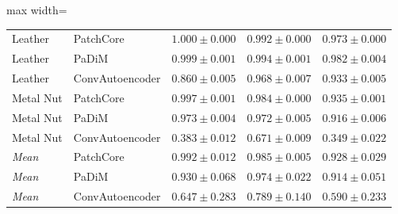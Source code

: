 \begin{table}[tbp]
\begin{adjustbox}{max width=\linewidth}
\begin{tabular}{llccc}
\midrule
Leather & PatchCore & $1.000 \pm 0.000$ & $0.992 \pm 0.000$ & $0.973 \pm 0.000$ \\
Leather & PaDiM & $0.999 \pm 0.001$ & $0.994 \pm 0.001$ & $0.982 \pm 0.004$ \\
Leather & ConvAutoencoder & $0.860 \pm 0.005$ & $0.968 \pm 0.007$ & $0.933 \pm 0.005$ \\
\midrule
Metal Nut & PatchCore & $0.997 \pm 0.001$ & $0.984 \pm 0.000$ & $0.935 \pm 0.001$ \\
Metal Nut & PaDiM & $0.973 \pm 0.004$ & $0.972 \pm 0.005$ & $0.916 \pm 0.006$ \\
Metal Nut & ConvAutoencoder & $0.383 \pm 0.012$ & $0.671 \pm 0.009$ & $0.349 \pm 0.022$ \\
\midrule
\textit{Mean} & PatchCore & $0.992 \pm 0.012$ & $0.985 \pm 0.005$ & $0.928 \pm 0.029$ \\
\textit{Mean} & PaDiM & $0.930 \pm 0.068$ & $0.974 \pm 0.022$ & $0.914 \pm 0.051$ \\
\textit{Mean} & ConvAutoencoder & $0.647 \pm 0.283$ & $0.789 \pm 0.140$ & $0.590 \pm 0.233$ \\
\bottomrule
\end{tabular}
\end{adjustbox}
\end{table}
